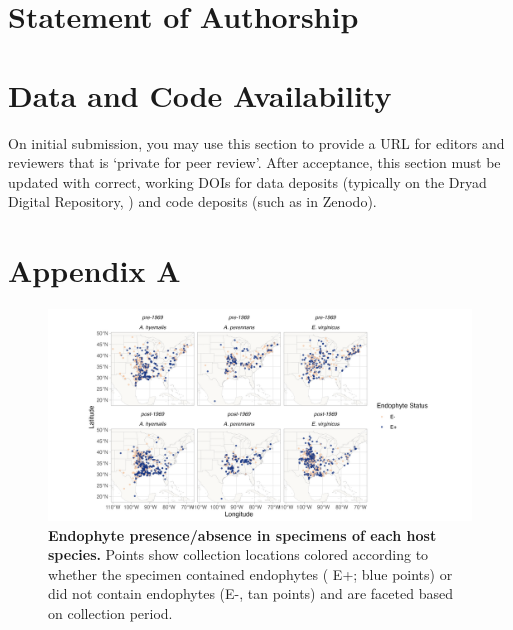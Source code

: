 \documentclass[11pt]{article}
\begin{document}
	
	\section*{Statement of Authorship}
	

	
	\section*{Data and Code Availability}
	
	On initial submission, you may use this section to provide a URL for editors and reviewers that is `private for peer review'. After acceptance, this section must be updated with correct, working DOIs for data deposits (typically on the Dryad Digital Repository, ) and code deposits (such as in Zenodo). 
	
	\section*{Appendix A}
	\renewcommand{\thefigure}{A\arabic{figure}}
	\setcounter{figure}{0}
	
		\renewcommand{\thetable}{A\arabic{table}}
	\setcounter{equation}{0}  %
	\setcounter{figure}{0}
	\setcounter{table}{0}
	
	\begin{figure}[H]
		\centering
		\includegraphics[width = \linewidth]{../Plots/endo_status_map.png}
		\caption{\textbf{Endophyte presence/absence in specimens of each host species.} Points show collection locations colored according to whether the specimen contained endophytes ( E+; blue points) or did not contain endophytes (E-, tan points) and are faceted based on collection period.}
		\label{fig:endo_status_map}
	\end{figure}
	
\end{document}
